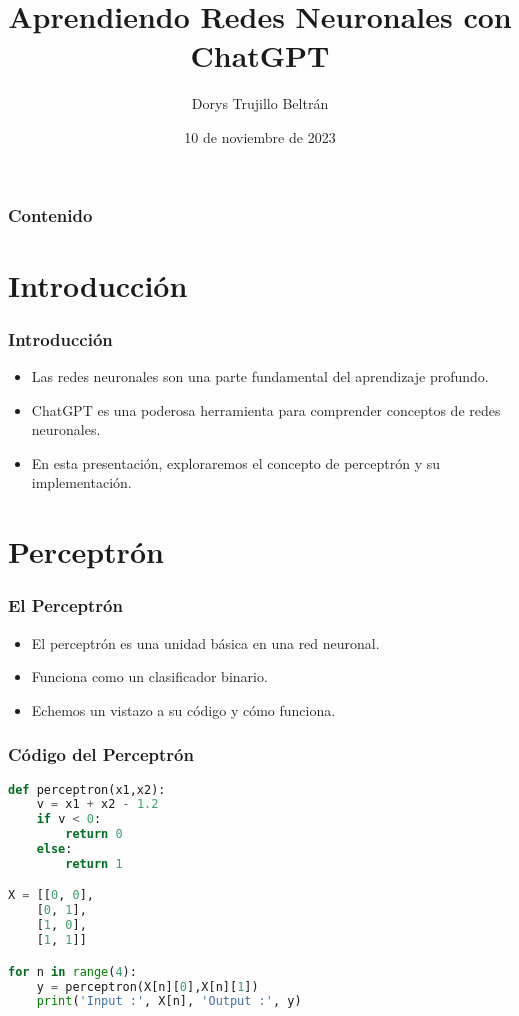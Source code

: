 \documentclass{beamer}
\title{Aprendiendo Redes Neuronales con ChatGPT}
\author{Dorys Trujillo Beltrán}
\institute{Prompt Engineering}
\date{10 de noviembre de 2023}
\begin{document}
\begin{frame}
\titlepage
\end{frame}

\begin{frame}
\frametitle{Contenido}
\tableofcontents
\end{frame}

\section{Introducción}

\begin{frame}
\frametitle{Introducción}
\begin{itemize}
\item Las redes neuronales son una parte fundamental del aprendizaje profundo.
\item ChatGPT es una poderosa herramienta para comprender conceptos de redes neuronales.
\item En esta presentación, exploraremos el concepto de perceptrón y su implementación.
\end{itemize}
\end{frame}

\section{Perceptrón}

\begin{frame}
\frametitle{El Perceptrón}
\begin{itemize}
\item El perceptrón es una unidad básica en una red neuronal.
\item Funciona como un clasificador binario.
\item Echemos un vistazo a su código y cómo funciona.
\end{itemize}
\end{frame}

\begin{frame}[fragile]
\frametitle{Código del Perceptrón}
\begin{lstlisting}[language=Python]
def perceptron(x1,x2):
    v = x1 + x2 - 1.2
    if v < 0:
        return 0
    else:
        return 1

X = [[0, 0],
    [0, 1],
    [1, 0],
    [1, 1]]

for n in range(4):
    y = perceptron(X[n][0],X[n][1])
    print('Input :', X[n], 'Output :', y)
\end{lstlisting}
\end{frame}
\end{document}
